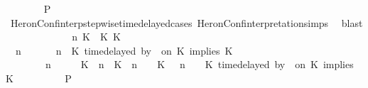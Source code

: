 \begin{isabellebody}
\ \ \ \ \ \ \isamarkupfalse%
\ {\isacharquery}P\isanewline
\ \ \ \ \ \ \ \ \isamarkupfalse%
\ HeronConf{\isacharunderscore}interp{\isacharunderscore}stepwise{\isacharunderscore}timedelayed{\isacharunderscore}cases\ HeronConf{\isacharunderscore}interpretation{\isachardot}simps\ \isamarkupfalse%
\ blast\isanewline
\ \ \ \ \isamarkupfalse%
\isanewline
\ \ \ \ \ \ \isamarkupfalse%
\ {\isasymGamma}\ n\ K\ {\isasymdelta}{\isasymtau}\ K\ K\ {\isasymPsi}\ {\isasymPhi}\isanewline
\ \ \ \ \ \ \isamarkupfalse%
\ {\isacartoucheopen}{\isacharparenleft}{\isasymGamma}\ n\ {\isasymturnstile}\ {\isasymPsi}\ {\isasymtriangleright}\ {\isasymPhi}\ {\isacharequal}\ {\isacharparenleft}{\isasymGamma}{\isacharcomma}\ n\ {\isasymturnstile}\ {\isacharparenleft}{\isacharparenleft}K\ time{\isacharminus}delayed\ by\ {\isasymdelta}{\isasymtau}\ on\ K\ implies\ K\ {\isacharhash}\ {\isasymPsi}{\isacharparenright}\ {\isasymtriangleright}\ {\isasymPhi}{\isacharparenright}{\isacartoucheclose}\isanewline
\ \ \ \ \ \ \ {\isacartoucheopen}{\isacharparenleft}{\isasymGamma}\ n\ {\isasymturnstile}\ {\isasymPsi}\ {\isasymtriangleright}\ {\isasymPhi}\ {\isacharequal}\ {\isacharparenleft}{\isacharparenleft}{\isacharparenleft}K\ {\isasymUp}\ n{\isacharparenright}\ {\isacharhash}\ {\isacharparenleft}K\ {\isacharat}\ n\ {\isasymoplus}\ {\isasymdelta}{\isasymtau}\ {\isasymRightarrow}\ K\ {\isacharhash}\ {\isasymGamma}{\isacharparenright}{\isacharcomma}\ n\ {\isasymturnstile}\ {\isasymPsi}\ {\isasymtriangleright}\ {\isacharparenleft}{\isacharparenleft}K\ time{\isacharminus}delayed\ by\ {\isasymdelta}{\isasymtau}\ on\ K\ implies\ K\ {\isacharhash}\ {\isasymPhi}{\isacharparenright}{\isacharparenright}{\isacartoucheclose}\isanewline
\ \ \ \ \ \ \isamarkupfalse%
\ {\isacharquery}P\isanewline
\ \ \ \ \ \ \ \ \isamarkupfalse%

\end{isabellebody}
